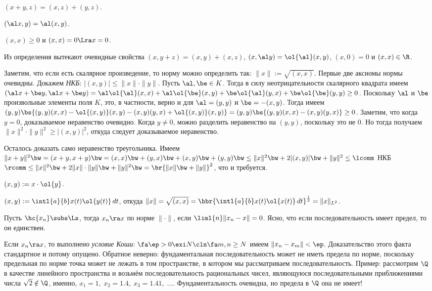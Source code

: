 \documentclass[a4paper]{article}
\newcommand{\intlab}{\intl{a}{b}}
\begin{document}
 $(x+y,z)=(x,z)+(y,z)$.

 $(\al x,y)=\al(x,y)$.

 $(x,x)\ge 0$ и $(x,x)=0 \Lra x = 0$.

Из определения вытекают очевидные свойства $(x,y+z)=(x,y)+(x,z)$, $(x, \al y) = \ol{\al}(x,y)$,
$(x,0)=0$ и $(x,x) \in \R$.

Заметим, что если есть скалярное произведение, то норму можно определить так:
$\|x\| := \sqrt{(x,x)}$. Первые две аксиомы нормы очевидны.
Докажем \emph{НКБ}: $|(x,y)| \le \|x\| \cdot \|y\|$. Пусть $\al, \be \in K$. Тогда в силу
неотрицательности скалярного квадрата имеем
$(\al x + \be y, \al x + \be y) = \al \ol{\al}(x,x) + \al \ol{\be}(x,y) + \be\ol{\al}(y,x) + \be \ol{\be}(y,y) \ge 0$.
Поскольку $\al$ и $\be$\т произвольные элементы поля $K$, это, в частности, верно и
для $\al = (y,y)$ и $\be = -(x,y)$. Тогда имеем
$(y,y)\bs{(y,y)(x,x) - \ol{(x,y)}(x,y) - (x,y)(y,x) + \ol{(x,y)}(x,y)} = (y,y)\bs{(y,y)(x,x)-(x,y)(y,x)} \ge 0$.
Заметим, что когда $y = 0$, доказываемое неравенство очевидно. Когда $y \neq 0$, можно разделить
неравенство на $(y,y)$, поскольку это не 0. Но тогда получаем
$\|x\|^2\cdot\|y\|^2 \ge |(x,y)|^2$, откуда следует доказываемое неравенство.

Осталось доказать само неравенство треугольника. Имеем $\|x+y\|^2 \bw= (x+y,x+y) \bw= (x,x) \bw+ (y,x) \bw+ (x,y) \bw+
(y,y) \bw\le \|x\|^2 \bw+ 2|(x,y)| \bw+ \|y\|^2 \le \lcomm$ НКБ $\rcomm \le \|x\|^2 \bw+ 2\|x\|\cdot\|y\| \bw+ \|y\|^2 \bw=
\br{\|x\| \bw+ \|y\|}^2$, что и требуется.

\begin{ex}
 $(x,y) := x \cdot \ol{y}$.

 $(x,y) := \intlab x(t)\ol{y(t)}\,d t$, откуда $\|x\| = \sqrt{(x,x)} =
\bbr{\intlab x(t)\ol{x(t)}\,d t}^{\frac{1}{2}} = \|x\|_{L^2}$.
\end{ex}

\begin{df}
Пусть $\hc{x_n} \subs \Ls$, тогда $x_n \ra x$ по норме $\|\cdot\|$, если $\liml{n}\|x_n - x\| = 0$.
Ясно, что если последовательность имеет предел, то он единствен.
\end{df}

Если $x_n \ra x$, то выполнено \emph{условие Коши}: $\fa \ep > 0 \exi N\cln \fa m,n \ge N$
имеем $\|x_n - x_m\| < \ep$. Доказательство этого факта стандартное и потому опущено.
Обратное неверно: фундаментальная последовательность может не иметь предела
по норме, поскольку предельная по норме точка может не лежать в том пространстве, в
котором мы рассматриваем последовательность.
Пример: рассмотрим $\Q$ в качестве линейного пространства и возьмём последовательность
рациональных чисел, являющуюся последовательными приближениями числа $\sqrt{2} \notin \Q$,
именно, $x_1 = 1,\; x_2 = 1.4,\; x_3 = 1.41,\; \dots$.
Фундаментальность очевидна, но предела в $\Q$ она не имеет!
\end{document}
